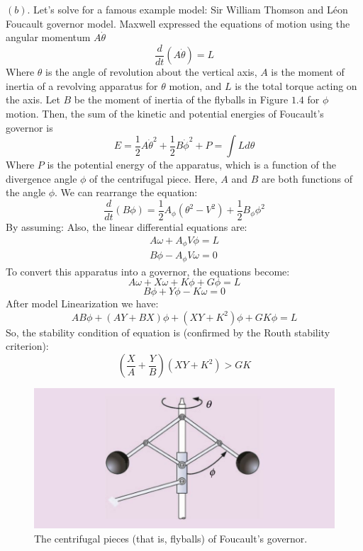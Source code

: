 \documentclass[11pt]{scrartcl} %
\begin{document}
$(b) .$ \newline
Let’s solve for a famous example model: Sir William Thomson and Léon Foucault governor model. Maxwell expressed the equations of motion using the angular momentum $A \dot{\theta}$
\begin{equation}
\frac{d}{d t}(A \dot{\theta})=L
\end{equation}
Where $\theta$ is the angle of revolution about the vertical axis, $A$ is the moment of inertia of a revolving apparatus for $\theta$ motion, and $L$ is the total torque acting on the axis. Let $B$ be the moment of inertia of the flyballs in Figure $1.4 $ for $\phi$ motion. Then, the sum of the kinetic and potential energies of Foucault's governor is
\begin{equation}
E=\frac{1}{2} A \dot{\theta}^{2}+\frac{1}{2} B \dot{\phi}^{2}+P=\int L d \theta
\end{equation}
Where $P$ is the potential energy of the apparatus, which is a function of the divergence angle $\phi$ of the centrifugal piece. Here, $A$ and $B$ are both functions of the angle $\phi$. We can rearrange the equation:
\begin{equation}
\frac{d}{d t}(B \phi)=\frac{1}{2} A_{\phi}\left(\theta^{2}-V^{2}\right)+\frac{1}{2} B_{\phi} \phi^{2}
\end{equation}
By assuming:
Also, the linear differential equations are:
\begin{equation}
\begin{array}{l}
A \omega+A_{\phi} V \phi=L \\
B \phi-A_{\phi} V \omega=0
\end{array}
\end{equation}
To convert this apparatus into a governor, the equations become:
\begin{equation}
A \omega+X \omega+K \phi+G \phi=L
\end{equation}
\begin{equation}
B \phi+Y \phi-K \omega=0
\end{equation}
After model Linearization we have:
\begin{equation}
A B \phi+(A Y+B X) \phi+\left(X Y+K^{2}\right) \phi+G K \phi=L
\end{equation}
So, the stability condition of equation is (confirmed by the Routh stability criterion):
\begin{equation}
\left(\frac{X}{A}+\frac{Y}{B}\right)\left(X Y+K^{2}\right)>G K
\end{equation}
\begin{figure}[h] 
	\centering
	\includegraphics[width=0.5\columnwidth]{images/p4.JPG}
	\caption{The centrifugal pieces (that is, flyballs) of Foucault’s governor.}
\end{figure} \newpage
\end{document}
